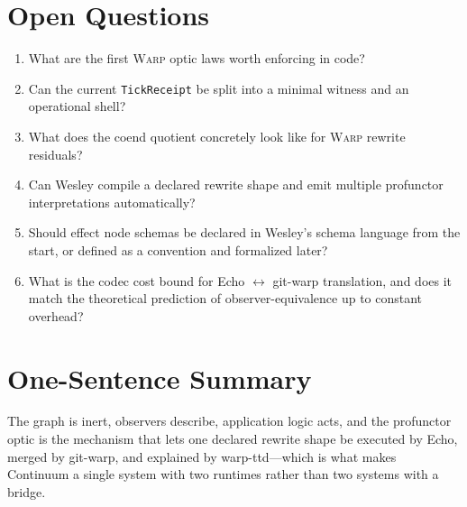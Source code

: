 \documentclass[11pt]{article}
\newcommand{\WARP}{\textsc{Warp}}
\theoremstyle{definition}
\begin{document}
\section{Open Questions}

\begin{enumerate}[leftmargin=2em]
\item What are the first \WARP{} optic laws worth enforcing in code?
\item Can the current \texttt{TickReceipt} be split into a minimal
  witness and an operational shell?
\item What does the coend quotient concretely look like for \WARP{}
  rewrite residuals?
\item Can Wesley compile a declared rewrite shape and emit multiple
  profunctor interpretations automatically?
\item Should effect node schemas be declared in Wesley's schema
  language from the start, or defined as a convention and formalized
  later?
\item What is the codec cost bound for Echo $\leftrightarrow$
  git-warp translation, and does it match the theoretical prediction
  of observer-equivalence up to constant overhead?
\end{enumerate}

\section{One-Sentence Summary}

The graph is inert, observers describe, application logic acts, and
the profunctor optic is the mechanism that lets one declared rewrite
shape be executed by Echo, merged by git-warp, and explained by
warp-ttd---which is what makes Continuum a single system with two
runtimes rather than two systems with a bridge.
\end{document}
